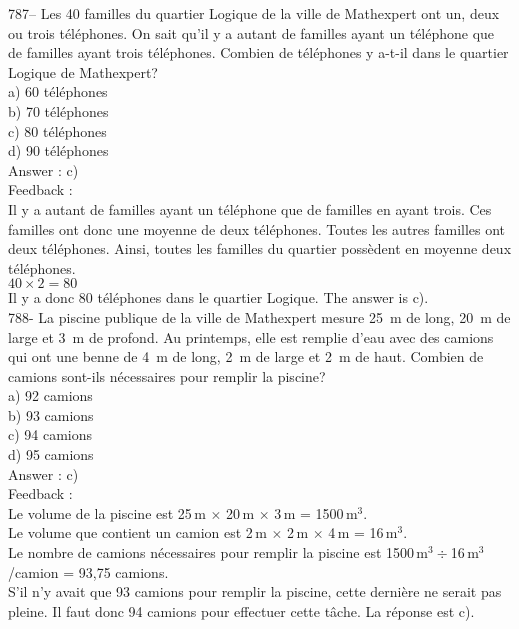 \documentclass[letterpaper, 12pt]{article}
\begin{document}
787-- Les 40 familles du quartier Logique de la ville de Mathexpert ont un,
deux ou trois t\'el\'ephones.  On sait qu'il y a autant de familles ayant un
t\'el\'ephone que de familles ayant trois t\'el\'ephones.  Combien de
t\'el\'ephones y a-t-il dans le quartier Logique de Mathexpert?\\
a) 60 t\'el\'ephones\\
b) 70 t\'el\'ephones\\
c) 80 t\'el\'ephones\\
d) 90 t\'el\'ephones\\

Answer : c)\\

Feedback : \\
Il y a autant de familles ayant un t\'el\'ephone que de familles en ayant
trois.  Ces familles ont donc une moyenne de deux t\'el\'ephones.  Toutes
les autres familles ont deux t\'el\'ephones.  Ainsi, toutes les familles du
quartier poss\`edent en moyenne deux t\'el\'ephones.  \\
$40\times2=80$\\
Il y a donc 80 t\'el\'ephones dans le quartier Logique.  The answer is
c).\\

788- La piscine publique de la ville de Mathexpert mesure 25~m de long, 20~m
de large et 3~m de profond.  Au printemps, elle est remplie d'eau avec des
camions qui ont une benne de 4~m de long, 2~m de large et 2~m de haut.
Combien de camions sont-ils n\'ecessaires pour remplir la piscine?\\
a) 92 camions\\
b) 93 camions\\
c) 94 camions\\
d) 95 camions\\

Answer : c)\\

Feedback : \\
Le volume de la piscine est 25\,m $\times$ 20\,m $\times$ 3\,m =
1500\,m$^{3}$.\\
Le volume que contient un camion est 2\,m $\times$ 2\,m $\times$ 4\,m =
16\,m$^{3}$.\\
Le nombre de camions n\'ecessaires pour remplir la piscine est
1500\,m$^{3}\div$16\,m$^{3}$/camion = 93,75 camions.\\
S'il n'y avait que 93 camions pour remplir la piscine, cette derni\`ere ne
serait pas pleine. Il faut donc 94 camions pour effectuer cette t\^ache. La
r\'eponse est c).\\
\end{document}
